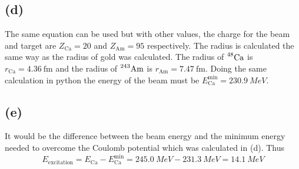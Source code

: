 \subsection*{(d)}
The same equation can be used but with other values, the charge for the beam and target are $Z_\mathrm{Ca} = 20$ and $Z_\mathrm{Am} = 95$ respectively. The radius is calculated the same way as the radius of gold was calculated. The radius of $\nuc{Ca}{48}$ is $ r_\mathrm{Ca} = \SI{4.36}{\femto\m}$ and the radius of $\nuc{Am}{243}$ is $r_\mathrm{Am} = \SI{7.47}{\femto\m}$. Doing the same calculation in python the energy of the beam must be $E_\mathrm{Ca}^\mathrm{min} = \SI{230.9}{MeV}$.


\subsection*{(e)}
It would be the difference between the beam energy and the minimum energy needed to overcome the Coulomb potential which was calculated in (d). Thus 
\begin{equation}
	E_\mathrm{excitation} = E_\mathrm{Ca} - E_\mathrm{Ca}^\mathrm{min} = \SI{245.0}{MeV} - \SI{231.3}{MeV} = \SI{14.1}{MeV}
\end{equation}

